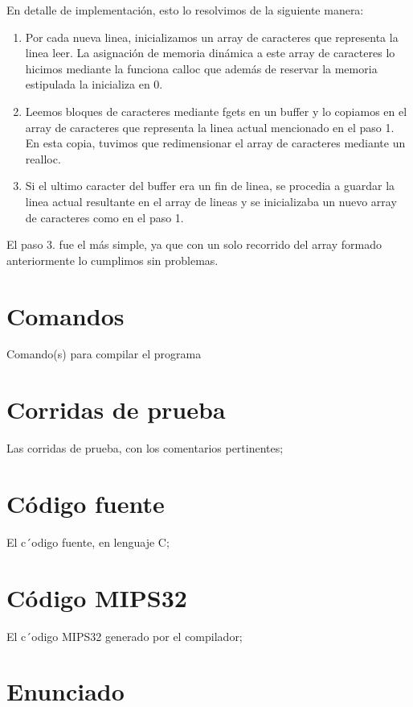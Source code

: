 \documentclass[a4paper,11pt]{article}
\begin{document}
En detalle de implementaci\'on, esto lo resolvimos de la siguiente manera:
\begin{enumerate}
	\item Por cada nueva linea, inicializamos un array de caracteres que representa la linea leer. La asignaci\'on de memoria din\'amica a este array de caracteres lo hicimos mediante la funciona calloc que adem\'as de reservar la memoria estipulada la inicializa en 0.
	\item Leemos bloques de caracteres mediante fgets en un buffer y lo copiamos en el array de caracteres que representa la linea actual mencionado en el paso 1. En esta copia, tuvimos que redimensionar el array de caracteres mediante un realloc.
	\item Si el ultimo caracter del buffer era un fin de linea, se procedia a guardar la linea actual resultante en el array de lineas y se inicializaba un nuevo array de caracteres como en el paso 1.
\end{enumerate}


El paso 3. fue el m\'as simple, ya que con un solo recorrido del array formado anteriormente lo cumplimos sin problemas.

\section{Comandos}
Comando(s) para compilar el programa

\section{Corridas de prueba}
Las corridas de prueba, con los comentarios pertinentes;

\section{C\'odigo fuente}
El c´odigo fuente, en lenguaje C;

\section{C\'odigo MIPS32}
El c´odigo MIPS32 generado por el compilador;

\section{Enunciado}


\maketitle
\end{document}
